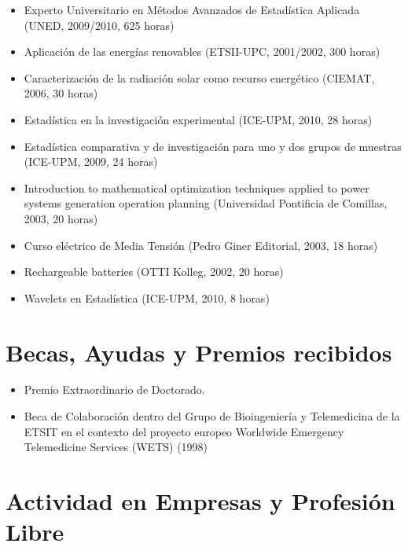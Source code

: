 \documentclass[article, a4paper]{memoir}
\begin{document}
\begin{itemize}
\item Experto Universitario en Métodos Avanzados de Estadística Aplicada (UNED, 2009/2010, 625 horas)

\item Aplicación de las energías renovables (ETSII-UPC, 2001/2002, 300 horas)

\item Caracterización de la radiación solar como recurso energético (CIEMAT, 2006, 30 horas)

\item Estadística en la investigación experimental (ICE-UPM, 2010, 28 horas)

\item Estadística comparativa y de investigación para uno y dos grupos de muestras (ICE-UPM, 2009, 24 horas)

\item Introduction to mathematical optimization techniques applied to power systems generation operation planning (Universidad Pontificia de Comillas, 2003, 20 horas)

\item Curso eléctrico de Media Tensión (Pedro Giner Editorial, 2003, 18 horas)

\item Rechargeable batteries (OTTI Kolleg, 2002, 20 horas)

\item Wavelets en Estadística (ICE-UPM, 2010, 8 horas)
\end{itemize}


\section{Becas, Ayudas y Premios recibidos}
\label{sec:orgheadline81}

\begin{itemize}
\item Premio Extraordinario de Doctorado.
\item Beca de Colaboración dentro del Grupo de Bioingeniería y Telemedicina de la ETSIT en el contexto del proyecto europeo \guillemotleft{}Worldwide Emergency Telemedicine Services\guillemotright{} (WETS) (1998)
\end{itemize}


\section{Actividad en Empresas y Profesión Libre}
\label{sec:orgheadline82}
\end{document}
